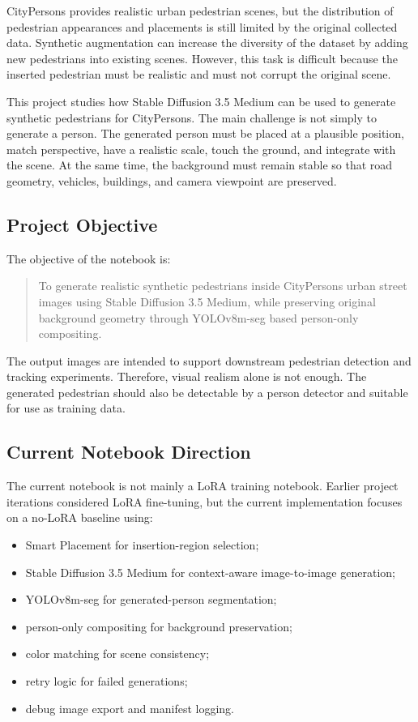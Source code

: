 \documentclass[12pt,a4paper]{article}
\begin{document}
CityPersons provides realistic urban pedestrian scenes, but the distribution of
pedestrian appearances and placements is still limited by the original collected
data. Synthetic augmentation can increase the diversity of the dataset by adding
new pedestrians into existing scenes. However, this task is difficult because
the inserted pedestrian must be realistic and must not corrupt the original
scene.

This project studies how Stable Diffusion 3.5 Medium can be used to generate
synthetic pedestrians for CityPersons. The main challenge is not simply to
generate a person. The generated person must be placed at a plausible position,
match perspective, have a realistic scale, touch the ground, and integrate with
the scene. At the same time, the background must remain stable so that road
geometry, vehicles, buildings, and camera viewpoint are preserved.

\subsection{Project Objective}

The objective of the notebook is:

\begin{quote}
To generate realistic synthetic pedestrians inside CityPersons urban street
images using Stable Diffusion 3.5 Medium, while preserving original background
geometry through YOLOv8m-seg based person-only compositing.
\end{quote}

The output images are intended to support downstream pedestrian detection and
tracking experiments. Therefore, visual realism alone is not enough. The
generated pedestrian should also be detectable by a person detector and suitable
for use as training data.

\subsection{Current Notebook Direction}

The current notebook is not mainly a LoRA training notebook. Earlier project
iterations considered LoRA fine-tuning, but the current implementation focuses
on a no-LoRA baseline using:

\begin{itemize}
    \item Smart Placement for insertion-region selection;
    \item Stable Diffusion 3.5 Medium for context-aware image-to-image generation;
    \item YOLOv8m-seg for generated-person segmentation;
    \item person-only compositing for background preservation;
    \item color matching for scene consistency;
    \item retry logic for failed generations;
    \item debug image export and manifest logging.
\end{itemize}
\end{document}
